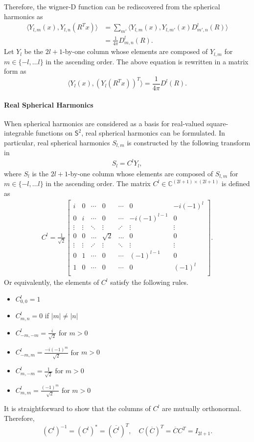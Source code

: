 \documentclass[onecolumn,11pt]{IEEEtran}
\newcommand{\pair}[1]{\ensuremath{\langle #1 \rangle}}
\newcommand{\Cp}{\ensuremath{\mathbb{C}}}
\newcommand{\Sph}{\ensuremath{\mathsf{S}}}
\begin{document}
Therefore, the wigner-D function can be rediscovered from the spherical harmonics as
\begin{align*}
    \pair{Y_{l,m}(x), Y_{l,n}(R^T x) } &= \sum_{m'} \pair{Y_{l,m}(x), Y_{l,m'}(x) D^l_{m',n}(R) }\\
    & = \frac{1}{4\pi} D^l_{m,n}(R).
\end{align*}
Let $Y_l$ be the $2l+1$-by-one column whose elements are composed of $Y_{l,m}$ for $m\in\{-l,\ldots l\}$ in the ascending order. 
The above equation is rewritten in a matrix form as
\[
    \pair{ Y_l(x), (Y_l(R^Tx))^T } = \frac{1}{4\pi} D^l(R).
\]

\paragraph{Real Spherical Harmonics}

When spherical harmonics are considered as a basis for real-valued square-integrable functions on $\Sph^2$, real spherical harmonics can be formulated. 
In particular, real spherical harmonics $S_{l,m}$ is constructed by the following transform in~\cite{BlaFloJMS97}
\begin{align}
    S_l = C^l Y_l,\label{eqn:YtoS}
\end{align}
where $S_l$ is the $2l+1$-by-one column whose elements are composed of $S_{l,m}$ for $m\in\{-l,\ldots l\}$ in the ascending order. 
The matrix $C^l\in\Cp^{(2l+1)\times(2l+1)}$ is defined as
\begin{align*}
    C^l=\frac{1}{\sqrt{2}}
    \begin{bmatrix}
        i & 0 & \cdots & 0 & \cdots & 0 & -i(-1)^l\\
        0 & i & \cdots & 0 & \cdots & -i(-1)^{l-1} & 0 \\
        \vdots & \vdots & \ddots &\vdots & \iddots & \vdots & \vdots\\
        0 & 0 & \hdots & \sqrt{2} & \hdots & 0 & 0 \\
        \vdots & \vdots & \iddots &\vdots & \ddots & \vdots & \vdots\\
        0 & 1 & \cdots & 0 & \cdots & (-1)^{l-1} & 0 \\
        1 & 0 & \cdots & 0 & \cdots & 0 & (-1)^l\\
    \end{bmatrix}.
\end{align*}
Or equivalently, the elements of $C^l$ satisfy the following rules.
\begin{itemize}
    \item $C^l_{0,0}=1$
    \item $C^l_{m,n}=0$ if $|m|\neq|n|$
    \item $C^l_{-m,-m} = \frac{i}{\sqrt{2}}$ for $m>0$
    \item $C^l_{-m,m}=\frac{-i(-1)^m}{\sqrt{2}}$ for $m>0$
    \item $C^l_{m,-m}=\frac{1}{\sqrt{2}}$ for $m>0$
    \item $C^l_{m,m}=\frac{(-1)^m}{\sqrt{2}} $ for $m>0$
\end{itemize}
It is straightforward to show that the columns of $C^l$ are mutually orthonormal. 
Therefore,
\[
    (C^l)^{-1} = (C^l)^* = (\overline{C^l})^T,\quad C (\overline C)^T= \overline{C} C^T = I_{2l+1}.
\]
\end{document}

